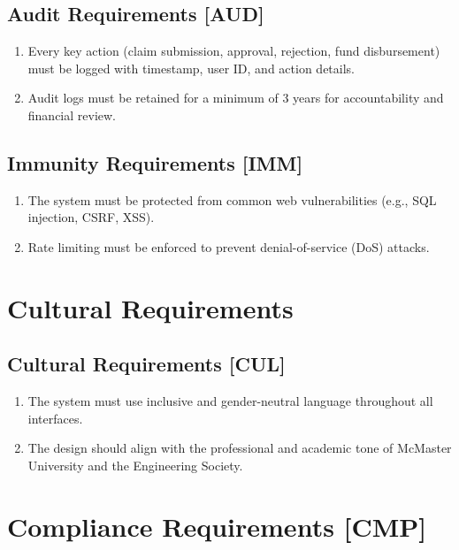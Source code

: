 \documentclass[12pt]{article}
\begin{document}
\begin{enumerate}
\subsection{Audit Requirements [AUD]}
\begin{enumerate}
    \item Every key action (claim submission, approval, rejection, fund disbursement) must be logged with timestamp, user ID, and action details.
    \item Audit logs must be retained for a minimum of 3 years for accountability and financial review.
\end{enumerate}

\subsection{Immunity Requirements [IMM]}
\begin{enumerate}
    \item The system must be protected from common web vulnerabilities (e.g., SQL injection, CSRF, XSS).
    \item Rate limiting must be enforced to prevent denial-of-service (DoS) attacks.
\end{enumerate}

\section{Cultural Requirements}

\subsection{Cultural Requirements [CUL]}
\begin{enumerate}
    \item The system must use inclusive and gender-neutral language throughout all interfaces.
    \item The design should align with the professional and academic tone of McMaster University and the Engineering Society.
\end{enumerate}

\section{Compliance Requirements [CMP]}


\end{enumerate}
\end{document}
